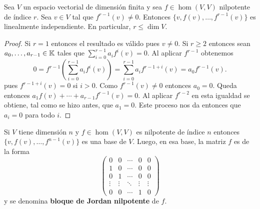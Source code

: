 \begin{prop}
	Sea $V$ un espacio vectorial de dimensión finita y sea $f\in\hom(V,V)$
	nilpotente de índice $r$. Sea $v\in V$ tal que $f^{r-1}(v)\ne0$. Entonces
	$\{v,f(v),\dots,f^{r-1}(v)\}$ es linealmente independiente. En particular,
	$r\leq\dim V$.

    \begin{proof}
        Si $r=1$ entonces el resultado es válido pues $v\ne0$. Si $r\geq2$
        entonces sean $a_0,\dots,a_{r-1}\in\mathbb{K}$ tales que
        $\sum_{i=0}^{r-1}a_if^i(v)=0$.  Al aplicar $f^{r-1}$ obtenemos
		\[
		0=f^{r-1}\left(\sum_{i=0}^{r-1}a_if^i(v)\right)=\sum_{i=0}^{r-1}a_if^{r-1+i}(v)=a_0f^{r-1}(v).
		\]
		pues $f^{r-1+i}(v)=0$ si $i>0$. Como $f^{r-1}(v)\ne0$ entonces $a_0=0$.
		Queda entonces $a_1f(v)+\cdots+a_{r-1}f^{r-1}(v)=0$. Al aplicar $f^{r-2}$
		en esta igualdad se obtiene, tal como se hizo antes, que $a_1=0$. Este
		proceso nos da entonces que $a_i=0$ para todo $i$.
    \end{proof}
\end{prop}

\begin{example}
	Si $V$ tiene dimensión $n$ y $f\in\hom(V,V)$ es nilpotente de índice $n$
	entonces $\{v,f(v),\dots,f^{n-1}(v)\}$ es una base de $V$. Luego, en esa
	base, la matriz $f$ es de la forma 
	\[
		\begin{pmatrix}
			0 & 0 & \cdots & 0 & 0\\
			1 & 0 & \cdots & 0 & 0\\
			0 & 1 & \cdots & 0 & 0\\
			\vdots & \vdots & \ddots & \vdots & \vdots\\
			0 & 0 & \cdots & 1 & 0
		\end{pmatrix}
	\]
	y se denomina \textbf{bloque de Jordan nilpotente} de $f$.
\end{example}

